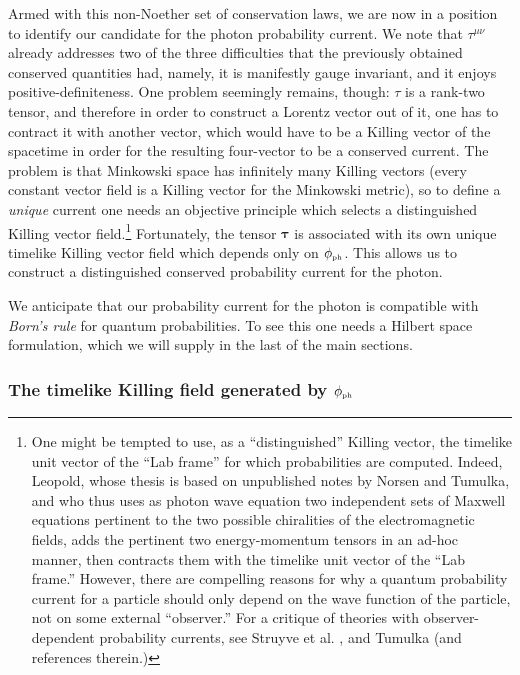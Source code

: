 \documentclass[11pt]{article}
\theoremstyle{definition}
\numberwithin{equation}{section}
\newcommand{\phiPH}{{\phi_{\mbox{\rm\tiny ph}}}}
\begin{document}
 Armed with this non-Noether set of conservation laws, we are now in a position to identify our candidate for the photon probability current. 
 We note that $\tau^{\mu\nu}$ already addresses two of the three difficulties that the previously obtained conserved quantities had,
 namely, it is manifestly gauge invariant, and it enjoys positive-definiteness. 
 One  problem seemingly remains, though: $\tau$ is a rank-two tensor, and therefore in order to construct a Lorentz vector out of it, 
one has to contract it with another vector, which would have to be a Killing vector of the spacetime in order for the resulting 
four-vector to be a conserved current.
 The problem is that Minkowski space has infinitely many Killing vectors (every constant vector field is a Killing vector for the 
Minkowski metric), so to define a {\em unique} current one needs an objective principle which selects a distinguished Killing vector 
field.\footnote{\label{LabFrame}One might be tempted to use,  as a ``distinguished'' Killing vector,
the timelike unit vector of the ``Lab frame'' for which probabilities are computed.
 Indeed, Leopold, whose thesis \cite{Leopold} is based on unpublished notes by Norsen and Tumulka, 
and who thus uses as photon wave equation two independent sets of Maxwell equations pertinent to the two possible chiralities of the
electromagnetic fields, adds the pertinent two energy-momentum tensors in an ad-hoc manner, then contracts them with the timelike 
unit vector of the ``Lab frame.''
 However, there are compelling reasons for why a quantum probability current for a particle should only depend on the wave function 
of the particle, not on some external ``observer.''
 For a critique of theories with observer-dependent probability currents, see Struyve et al. \cite{WardETal}, and 
Tumulka \cite{RodiUnromantic} (and references therein.)}  
 Fortunately, the tensor $\boldsymbol{\tau}$ is associated with its own unique timelike Killing vector field which 
depends only on $\phiPH$. 
 This allows us to construct a distinguished conserved probability current for the photon. 
 
 We anticipate that our probability current for the photon is compatible with {\em Born's rule} for quantum probabilities. 
 To see this one needs a Hilbert space formulation, which we will supply in the last of the main sections. 

 \subsubsection{The timelike Killing field generated by $\phiPH$}
\end{document}
